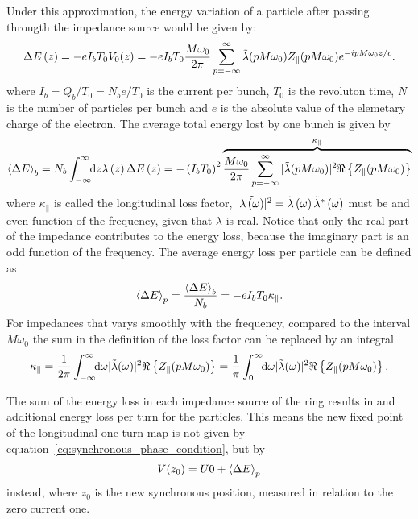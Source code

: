     Under this approximation, the energy variation of a particle after passing througth the impedance source would be given by:
    \begin{align}\label{eq:part_energy_loss}
	  	\Delta E\funcof{z} = -eI_bT_0V_0(z) = -eI_bT_0\frac{M\omega_0}{2\pi} \sum_{p=-\infty}^\infty \fourier{\lambda}(pM\omega_0)Z_\parallel(pM\omega_0)e^{-ipM\omega_0 z/c}.
    \end{align}
    where $I_b=Q_b/T_0=N_be/T_0$ is the current per bunch, $T_0$ is the revoluton time, $N$ is the number of particles per bunch and $e$ is the absolute value of the elemetary charge of the electron. The average total energy lost by one bunch is given by
    \begin{align}
        \average[b]{\Delta E} = N_b\infint{z}{\lambda\funcof{z}\Delta E\funcof{z}} = -\funcof{I_bT_0}^2\overbrace{\frac{M\omega_0}{2\pi} \sum_{p=-\infty}^\infty |\fourier{\lambda}(pM\omega_0)|^2\real{Z_\parallel(pM\omega_0)}}^{\kappa_\parallel}
    \end{align}
    where $\kappa_\parallel$ is called the longitudinal loss factor, $|\fourier{\lambda\funcof{\omega}}|^2 = \fourier{\lambda}\funcof{\omega}\fourier{\lambda}^*\funcof{\omega}$ must be and even function of the frequency, given that $\lambda$ is real. Notice that only the real part of the impedance contributes to the energy loss, because the imaginary part is an odd function of the frequency. The average energy loss per particle can be defined as
    \begin{align}
        \average[p]{\Delta E} = \frac{\average[b]{\Delta E}}{N_b} = -eI_bT_0\kappa_\parallel.
    \end{align}
    For impedances that varys smoothly with the frequency, compared to the interval $M\omega_0$ the sum in the definition of the loss factor can be replaced by an integral
    \begin{align}
        \kappa_\parallel =
            \frac{1}{2\pi} \infint{\omega}|\fourier{\lambda}(\omega)|^2\real{Z_\parallel(pM\omega_0)} =
            \frac1\pi \defint{\omega}{|\fourier{\lambda}(\omega)|^2\real{Z_\parallel(pM\omega_0)}}{0}{\infty}.
    \end{align}

    The sum of the energy loss in each impedance source of the ring results in and additional energy loss per turn for the particles. This means the new fixed point of the longitudinal one turn map is not given by equation~\eqref{eq:synchronous_phase_condition}, but by
    \begin{align}
        V(z_0) = U0 + \average[p]{\Delta E}
    \end{align}
    instead, where $z_0$ is the new synchronous position, measured in relation to the zero current one.

